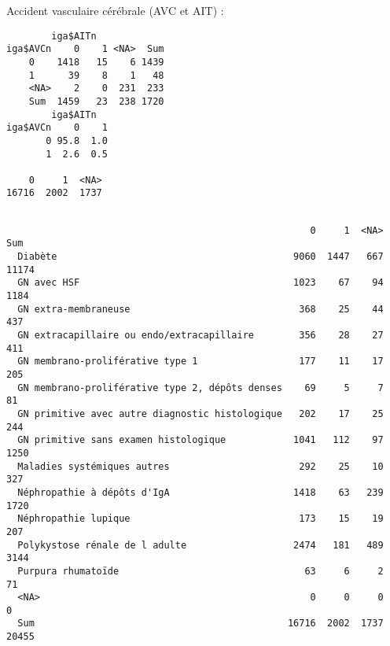 \documentclass[11pt,a4paper]{article}\usepackage[]{graphicx}\usepackage[]{color}
\makeatletter
\newenvironment{kframe}{%
 \def\at@end@of@kframe{}%
 \ifinner\ifhmode%
  \def\at@end@of@kframe{\end{minipage}}%
  \begin{minipage}{\columnwidth}%
 \fi\fi%
 \def\FrameCommand##1{\hskip\@totalleftmargin \hskip-\fboxsep
 \colorbox{shadecolor}{##1}\hskip-\fboxsep
     \hskip-\linewidth \hskip-\@totalleftmargin \hskip\columnwidth}%
 \MakeFramed {\advance\hsize-\width
   \@totalleftmargin\z@ \linewidth\hsize
   \@setminipage}}%
 {\par\unskip\endMakeFramed%
 \at@end@of@kframe}
\newenvironment{knitrout}{}{} %
\makeatother
\begin{document}
Accident vasculaire cérébrale (AVC et AIT) :

\begin{knitrout}
\color{fgcolor}\begin{kframe}
\begin{verbatim}
        iga$AITn
iga$AVCn    0    1 <NA>  Sum
    0    1418   15    6 1439
    1      39    8    1   48
    <NA>    2    0  231  233
    Sum  1459   23  238 1720
        iga$AITn
iga$AVCn    0    1
       0 95.8  1.0
       1  2.6  0.5

    0     1  <NA> 
16716  2002  1737 
\end{verbatim}
\end{kframe}
\end{knitrout}

\begin{knitrout}
\color{fgcolor}\begin{kframe}
\begin{verbatim}
                                                 
                                                      0     1  <NA>   Sum
  Diabète                                          9060  1447   667 11174
  GN avec HSF                                      1023    67    94  1184
  GN extra-membraneuse                              368    25    44   437
  GN extracapillaire ou endo/extracapillaire        356    28    27   411
  GN membrano-proliférative type 1                  177    11    17   205
  GN membrano-proliférative type 2, dépôts denses    69     5     7    81
  GN primitive avec autre diagnostic histologique   202    17    25   244
  GN primitive sans examen histologique            1041   112    97  1250
  Maladies systémiques autres                       292    25    10   327
  Néphropathie à dépôts d'IgA                      1418    63   239  1720
  Néphropathie lupique                              173    15    19   207
  Polykystose rénale de l adulte                   2474   181   489  3144
  Purpura rhumatoïde                                 63     6     2    71
  <NA>                                                0     0     0     0
  Sum                                             16716  2002  1737 20455
                                                 

\end{verbatim}
\end{kframe}
\end{knitrout}
\end{document}
